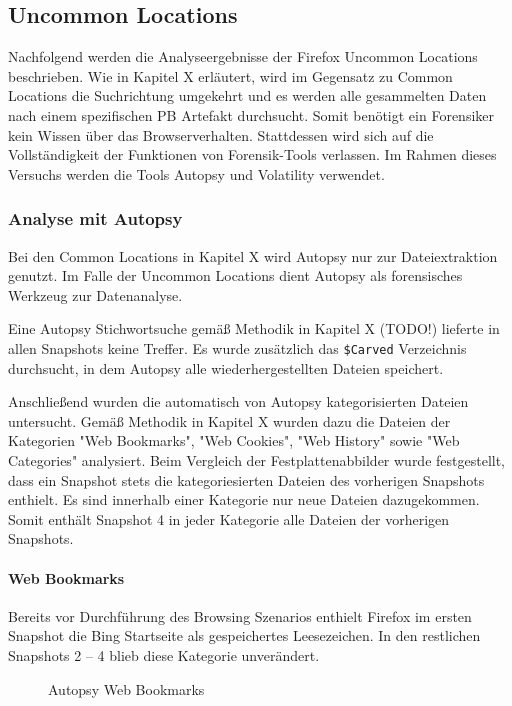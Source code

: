 \subsection*{Uncommon Locations}

Nachfolgend werden die Analyseergebnisse der Firefox Uncommon Locations beschrieben.
Wie in Kapitel X erläutert, wird im Gegensatz zu Common Locations die Suchrichtung umgekehrt und es werden alle gesammelten Daten nach einem spezifischen PB Artefakt durchsucht.
Somit benötigt ein Forensiker kein Wissen über das Browserverhalten. Stattdessen wird sich auf die Vollständigkeit der Funktionen von Forensik-Tools verlassen. Im Rahmen dieses Versuchs werden die Tools Autopsy und Volatility verwendet.

\subsubsection*{Analyse mit Autopsy}

Bei den Common Locations in Kapitel X wird Autopsy nur zur Dateiextraktion genutzt. Im Falle der Uncommon Locations dient Autopsy als forensisches Werkzeug zur Datenanalyse.

Eine Autopsy Stichwortsuche gemäß Methodik in Kapitel X (TODO!) lieferte in allen Snapshots keine Treffer. Es wurde zusätzlich das \texttt{\$Carved} Verzeichnis durchsucht, in dem Autopsy alle wiederhergestellten Dateien speichert.

Anschließend wurden die automatisch von Autopsy kategorisierten Dateien untersucht. Gemäß Methodik in Kapitel X wurden dazu die Dateien der Kategorien "Web Bookmarks", "Web Cookies", "Web History" sowie "Web Categories" analysiert.
Beim Vergleich der Festplattenabbilder wurde festgestellt, dass ein Snapshot stets die kategoriesierten Dateien des vorherigen Snapshots enthielt. Es sind innerhalb einer Kategorie nur neue Dateien dazugekommen. Somit enthält Snapshot 4 in jeder Kategorie alle Dateien der vorherigen Snapshots.

\paragraph*{Web Bookmarks}

Bereits vor Durchführung des Browsing Szenarios enthielt Firefox im ersten Snapshot die Bing Startseite als gespeichertes Leesezeichen. In den restlichen Snapshots 2 -- 4 blieb diese Kategorie unverändert.

\begin{figure}[h!]
	\centerline{}
	\label{chart:final-criteria}  
	\caption{Autopsy Web Bookmarks}
\end{figure}

